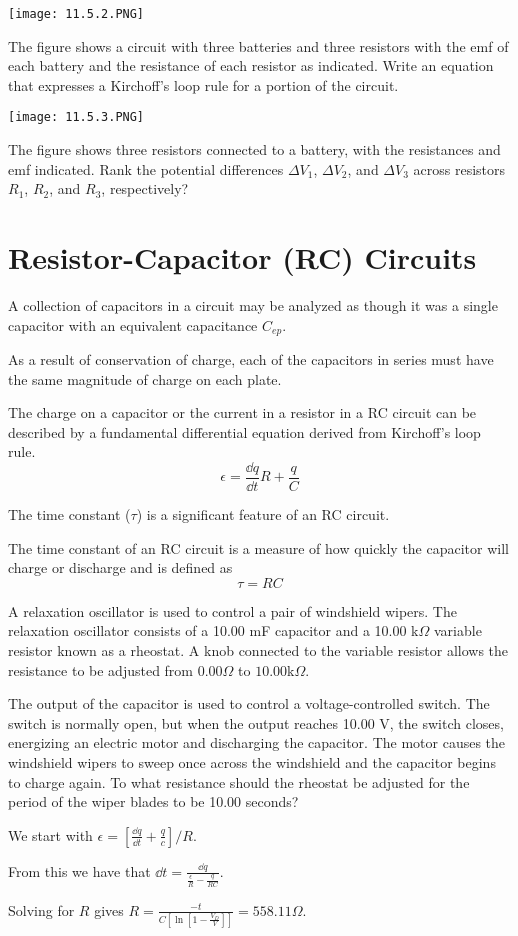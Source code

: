 \documentclass[../em.tex]{subfiles}
\begin{document}
\ex \begin{center}
    \texttt{[image: 11.5.2.PNG]}
\end{center}
The figure shows a circuit with three batteries and three resistors with the emf of each battery and the resistance of each resistor as indicated. 
Write an equation that expresses a Kirchoff's loop rule for a portion of the circuit.

\ex \begin{center}
    \texttt{[image: 11.5.3.PNG]}
\end{center}
The figure shows three resistors connected to a battery, with the resistances and emf indicated. 
Rank the potential differences $\Delta V_1$, $\Delta V_2$, and $\Delta V_3$ across resistors $R_1$, $R_2$, and $R_3$, respectively?

\section{Resistor-Capacitor (RC) Circuits}
A collection of capacitors in a circuit may be analyzed as though it was a single capacitor with an equivalent capacitance $C_{ep}$.

As a result of conservation of charge, each of the capacitors in series must have the same magnitude of charge on each plate.

The charge on a capacitor or the current in a resistor in a RC circuit can be described by a 
fundamental differential equation derived from Kirchoff's loop rule.
\[ \epsilon = \frac{\dd q}{\dd t}R+\frac{q}{C} \]

The time constant ($\tau$) is a significant feature of an RC circuit.

The time constant of an RC circuit is a measure of how quickly the capacitor will charge or discharge and is defined as 
\[\tau = RC\]

\begin{example}
    A relaxation oscillator is used to control a pair of windshield wipers. The relaxation oscillator consists of a 10.00 mF capacitor and a 10.00 k$\Omega$ variable resistor known as a rheostat.
    A knob connected to the variable resistor allows the resistance to be adjusted from $0.00\Omega$ to $10.00$k$\Omega$. 

    The output of the capacitor is used to control a voltage-controlled switch. The switch is normally open, but when the output reaches 10.00 V, the switch closes, energizing an electric motor and discharging the capacitor. The motor 
    causes the windshield wipers to sweep once across the windshield and the capacitor begins to charge again. To what resistance should the rheostat be adjusted for the period of the wiper blades to be 10.00 seconds?

    We start with $\epsilon = [\frac{\dd q}{\dd t}+\frac{q}{c}]/R$.

    From this we have that $\dd t = \frac{\dd q}{\frac{\epsilon}{R}-\frac{q}{RC}}$.

    Solving for $R$ gives $R=\frac{-t}{C[\ln[1-\frac{V_D}{V}]]}=558.11 \Omega$.
\end{example}
\end{document}
